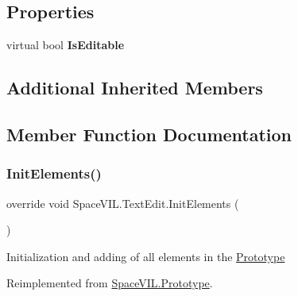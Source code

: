 \subsection*{Properties}
\begin{DoxyCompactItemize}
\item 
\mbox{\label{class_space_v_i_l_1_1_text_edit_a0b27b637cf5745cfdfbd108fb1c5ed0c}} 
virtual bool {\bfseries Is\+Editable}
\end{DoxyCompactItemize}
\subsection*{Additional Inherited Members}


\subsection{Member Function Documentation}
\mbox{\label{class_space_v_i_l_1_1_text_edit_ae84529a6ee07cd77c8420df465510bcf}} 
\subsubsection{\texorpdfstring{Init\+Elements()}{InitElements()}}
{\footnotesize\ttfamily override void Space\+V\+I\+L.\+Text\+Edit.\+Init\+Elements (\begin{DoxyParamCaption}{ }\end{DoxyParamCaption})\hspace{0.3cm}{\ttfamily [virtual]}}



Initialization and adding of all elements in the \mbox{\hyperlink{class_space_v_i_l_1_1_prototype}{Prototype}} 



Reimplemented from \mbox{\hyperlink{class_space_v_i_l_1_1_prototype_ac3379fe02923ee155b5b0084abf27420}{Space\+V\+I\+L.\+Prototype}}.

\mbox{\label{class_space_v_i_l_1_1_text_edit_ac587be091aa4d1525dfcec90d6105073}} 
